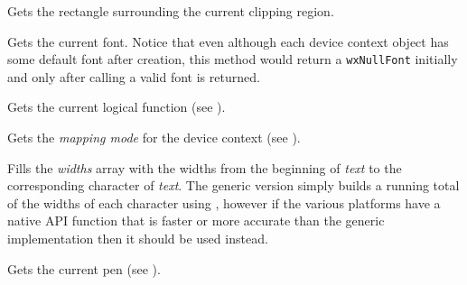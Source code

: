 Gets the rectangle surrounding the current clipping region.




\label{wxdcgetfont}


Gets the current font. Notice that even although each device context object has
some default font after creation, this method would return a \texttt{wxNullFont} 
initially and only after calling  a valid
font is returned.


\label{wxdcgetlogicalfunction}


Gets the current logical function (see ).


\label{wxdcgetmapmode}


Gets the {\it mapping mode} for the device context (see ).


\label{wxdcgetpartialtextextents}


Fills the {\it widths} array with the widths from the beginning of 
{\it text} to the corresponding character of {\it text}.  The generic
version simply builds a running total of the widths of each character
using , however if the
various platforms have a native API function that is faster or more
accurate than the generic implementation then it should be used
instead. 



\label{wxdcgetpen}


Gets the current pen (see ).


